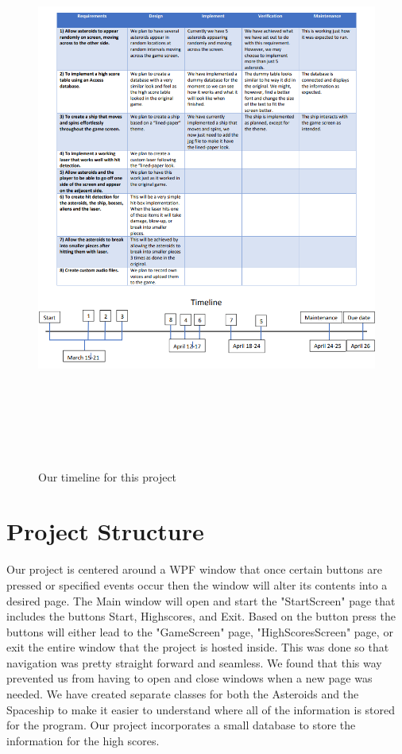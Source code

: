 \documentclass[10pt,conference,onecolumn,compsoc]{IEEEtran}
\begin{document}
\begin{figure}[ht!]
\includegraphics[height=700px, width=500px]{Timeline.png}
\caption{Our timeline for this project}
\label{Timeline}
\end{figure}

\section{Project Structure}
Our project is centered around a WPF window that once certain buttons are pressed or specified events occur then the window will alter its contents into a desired page. The Main window will open and start the "StartScreen" page that includes the buttons Start, Highscores, and Exit. Based on the button press the buttons will either lead to the "GameScreen" page, "HighScoresScreen" page, or exit the entire window that the project is hosted inside. This was done so that navigation was pretty straight forward and seamless. We found that this way prevented us from having to open and close windows when a new page was needed. We have created separate classes for both the Asteroids and the Spaceship to make it easier to understand where all of the information is stored for the program. Our project incorporates a small database to store the information for the high scores. 
\end{document}
